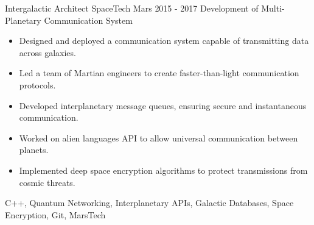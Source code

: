 \begin{sidesection}
    \vspace{2ex}

    \experience
        {Intergalactic Architect}
        {SpaceTech} %
        {Mars} %
        {2015 - 2017} %
        {Development of Multi-Planetary Communication System} %
        {
        \begin{itemize}
            \item {Designed and deployed a communication system capable of transmitting data across galaxies.}
            \item {Led a team of Martian engineers to create faster-than-light communication protocols.}
            \item {Developed interplanetary message queues, ensuring secure and instantaneous communication.}
            \item {Worked on alien languages API to allow universal communication between planets.}
            \item {Implemented deep space encryption algorithms to protect transmissions from cosmic threats.}
        \end{itemize}
        }
        {C++, Quantum Networking, Interplanetary APIs, Galactic Databases, Space Encryption, Git, MarsTech}

\end{sidesection}